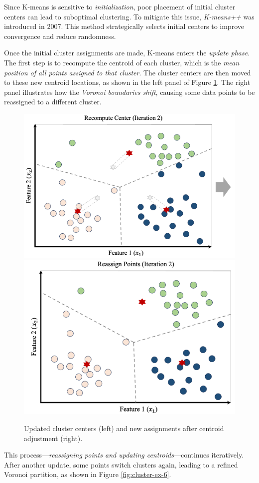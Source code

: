 \documentclass[
]{book}
\theoremstyle{definition}
\theoremstyle{definition}
\theoremstyle{definition}
\theoremstyle{definition}
\theoremstyle{remark}
\begin{document}
Since K-means is sensitive to \emph{initialization}, poor placement of initial cluster centers can lead to suboptimal clustering. To mitigate this issue, \emph{K-means++} \citep{arthur2006k} was introduced in 2007. This method strategically selects initial centers to improve convergence and reduce randomness.

Once the initial cluster assignments are made, K-means enters the \emph{update phase}. The first step is to recompute the centroid of each cluster, which is the \emph{mean position of all points assigned to that cluster}. The cluster centers are then moved to these new centroid locations, as shown in the left panel of Figure \ref{fig:cluster-ex-3}. The right panel illustrates how the \emph{Voronoi boundaries shift}, causing some data points to be reassigned to a different cluster.

\begin{figure}

{\centering \includegraphics[width=0.45\linewidth]{images/cluster_ex_4} \includegraphics[width=0.45\linewidth]{images/cluster_ex_5} 

}

\caption{Updated cluster centers (left) and new assignments after centroid adjustment (right).}\label{fig:cluster-ex-3}
\end{figure}

This process---\emph{reassigning points and updating centroids}---continues iteratively. After another update, some points switch clusters again, leading to a refined Voronoi partition, as shown in Figure \ref{fig:cluster-ex-6}.
\end{document}
